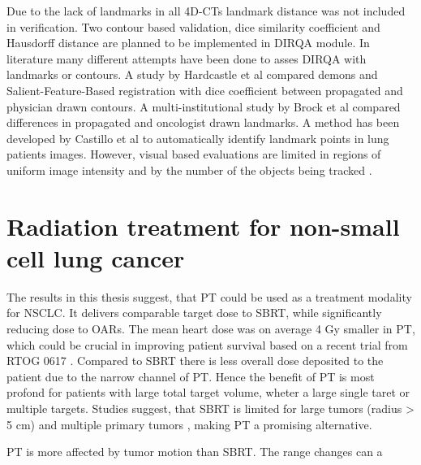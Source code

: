 \documentclass[type=dr, dr=rernat, accentcolor=tud7b,colorbacktitle, bigchapter, openright, twoside, 12pt ]{tudthesis}
\begin{document}

Due to the lack of landmarks in all 4D-CTs landmark distance was not included in verification. Two contour based validation, dice similarity coefficient \cite{Varadhan2013} and Hausdorff distance \cite{Huttenlocher1993}
are planned to be implemented in DIRQA module. In literature many different attempts have been done to asses DIRQA with landmarks or contours. 
A study by Hardcastle et al \cite{Hardcastle2012} 
compared demons and Salient-Feature-Based registration with dice coefficient between propagated and physician drawn contours.
A multi-institutional study by Brock et al \cite{Brock2010} compared differences in propagated and oncologist drawn landmarks. 
A method has been developed by Castillo et al \cite{Castillo2009} to automatically identify landmark points
in lung patients images. However, visual based evaluations are limited in regions of uniform image intensity and by the number of the objects being tracked \cite{Kashani2008, Liu2012}.



\newpage
\section{Radiation treatment for non-small cell lung cancer}

The results in this thesis suggest, that PT could be used as a treatment modality for NSCLC. It delivers comparable target dose to SBRT, while significantly reducing 
dose to OARs. The mean heart dose was on average 4 Gy smaller in PT, which could be crucial in improving patient survival based on a recent trial from RTOG 0617 \cite{Bradley2015}.
Compared to SBRT there is less overall dose deposited to the patient due to the narrow channel of PT.
Hence the benefit of PT is most profond for patients with large total target volume, wheter a large single taret or multiple targets. Studies suggest, that SBRT is limited for large
tumors (radius > 5 cm) and multiple primary tumors \cite{Timmerman2006, Georg2008, Westover2012}, making PT a promising alternative.


PT is more affected by tumor motion than SBRT. The range changes can a
\end{document}
